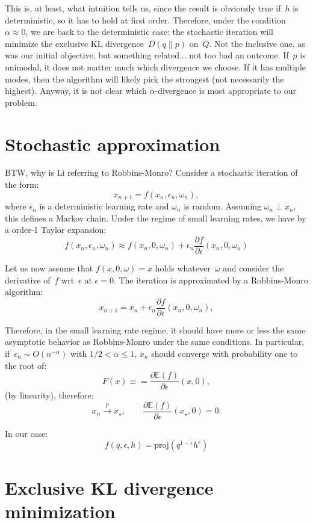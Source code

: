 \documentclass{article}
\begin{document}
This is, at least, what intuition tells us, since the result is obviously true if~$h$ is deterministic, so it has to hold at first order. Therefore, under the condition $\alpha\approx 0$, we are back to the deterministic case: the stochastic iteration will minimize the exclusive KL divergence~$D(q\|p)$ on~$Q$. Not the inclusive one, as was our initial objective, but something related... not too bad an outcome. If~$p$ is unimodal, it does not matter much which divergence we choose. If it has multiple modes, then the algorithm will likely pick the strongest (not necessarily the highest). Anyway, it is not clear which $\alpha$-divergence is most appropriate to our problem. 



\section{Stochastic approximation}

BTW, why is Li referring to Robbins-Monro? Consider a stochastic iteration of the form: $$
x_{n+1} = f(x_n, \epsilon_n, \omega_n),
$$
where $\epsilon_n$ is a deterministic learning rate and $\omega_n$ is random. Assuming $\omega_n\perp x_n$, this defines a Markov chain. Under the regime of small learning rates, we have by a order-1 Taylor expansion:
$$
f(x_n, \epsilon_n, \omega_n) 
\approx f(x_n, 0, \omega_n) + \epsilon_n \frac{\partial f}{\partial \epsilon} (x_n, 0,\omega_n)
$$

Let us now assume that $f(x, 0, \omega)=x$ holds whatever~$\omega$ and consider the derivative of~$f$ wrt~$\epsilon$ at $\epsilon=0$. The iteration is approximated by a Robbins-Monro algorithm:
$$
x_{n+1} = x_n + \epsilon_n \frac{\partial f}{\partial \epsilon}(x_n,0,\omega_n),
$$

Therefore, in the small learning rate regime, it should have more or less the same asymptotic behavior as Robbins-Monro under the same conditions. In particular, if~$\epsilon_n\sim O(n^{-\alpha})$ with $1/2<\alpha\leq 1$, $x_n$ should converge with probability one to the root of:
$$F(x)
\equiv 
= \frac{\partial \mathbb{E}(f)}{\partial \epsilon} (x,0),
$$
(by linearity), therefore:
$$
x_n \stackrel{p}{\to} x_\star,
\qquad 
\frac{\partial \mathbb{E}(f)}{\partial \epsilon} (x_\star,0)=0.
$$

In our case:
$$
f(q,\epsilon,h) = \text{proj}(q^{1-\epsilon}h^\epsilon)
$$



\section{Exclusive KL divergence minimization}
\end{document}
